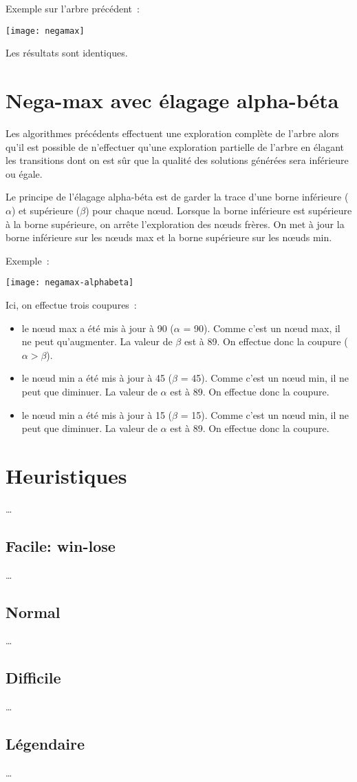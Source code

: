 Exemple sur l'arbre précédent :

\texttt{[image: negamax]}

Les résultats sont identiques.

\section{Nega-max avec élagage alpha-béta}

Les algorithmes précédents effectuent une exploration complète de l'arbre alors qu'il est possible de n'effectuer
qu'une exploration partielle de l'arbre en élagant les transitions dont on est sûr que la qualité des solutions générées
sera inférieure ou égale.

Le principe de l'élagage alpha-béta est de garder la trace d'une borne inférieure (\(\alpha\)) et supérieure (\(\beta\))
pour chaque nœud. Lorsque la borne inférieure est supérieure à la borne supérieure, on arrête l'exploration des nœuds frères.
On met à jour la borne inférieure sur les nœuds max et la borne supérieure sur les nœuds min.

Exemple :

\texttt{[image: negamax-alphabeta]}

Ici, on effectue trois coupures :
\begin{itemize}
    \item le nœud max a été mis à jour à 90 (\(\alpha\) = 90). Comme c'est un nœud max, il ne peut qu'augmenter.
        La valeur de \(\beta\) est à 89. On effectue donc la coupure (\(\alpha > \beta\)).
    \item le nœud min a été mis à jour à 45 (\(\beta\) = 45). Comme c'est un nœud min, il ne peut que diminuer.
        La valeur de \(\alpha\) est à 89. On effectue donc la coupure.
    \item le nœud min a été mis à jour à 15 (\(\beta\) = 15). Comme c'est un nœud min, il ne peut que diminuer.
        La valeur de \(\alpha\) est à 89. On effectue donc la coupure.
\end{itemize}

\section{Heuristiques}

…

\subsection{Facile: win-lose}

…

\subsection{Normal}

…

\subsection{Difficile}

…

\subsection{Légendaire}

…

